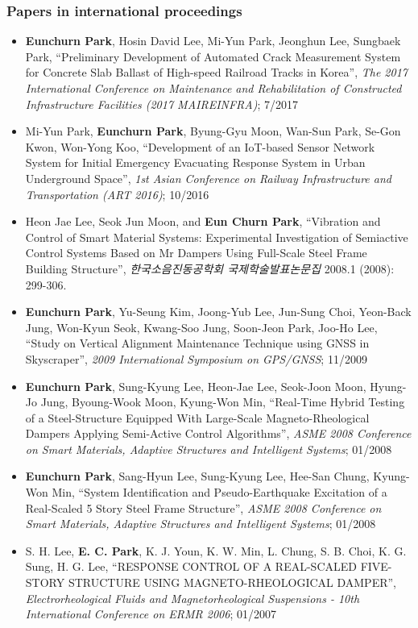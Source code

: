 \subsubsection*{Papers in international proceedings}
\begin{itemize}
\item
  \textbf{Eunchurn Park}, Hosin David Lee, Mi-Yun Park, Jeonghun Lee, Sungbaek Park, ``Preliminary Development of Automated Crack Measurement System for Concrete Slab Ballast of High-speed Railroad Tracks in Korea'', \emph{The 2017 International Conference on Maintenance and Rehabilitation of Constructed Infrastructure Facilities (2017 MAIREINFRA)}; 7/2017
\item
  Mi-Yun Park, \textbf{Eunchurn Park}, Byung-Gyu Moon, Wan-Sun Park, Se-Gon Kwon, Won-Yong Koo, ``Development of an IoT-based Sensor Network System for Initial Emergency Evacuating Response System in Urban Underground Space'', \emph{1st Asian Conference on Railway Infrastructure and Transportation (ART 2016)}; 10/2016
\item
  Heon Jae Lee, Seok Jun Moon, and \textbf{Eun Churn Park}, ``Vibration and Control of Smart Material Systems: Experimental Investigation of Semiactive Control Systems Based on Mr Dampers Using Full-Scale Steel Frame Building Structure'', \emph{한국소음진동공학회 국제학술발표논문집} 2008.1 (2008): 299-306.
\item
  \textbf{Eunchurn Park}, Yu-Seung Kim, Joong-Yub Lee, Jun-Sung Choi,
  Yeon-Back Jung, Won-Kyun Seok, Kwang-Soo Jung, Soon-Jeon Park, Joo-Ho
  Lee, ``Study on Vertical Alignment Maintenance Technique using GNSS in
  Skyscraper'', \emph{2009 International Symposium on GPS/GNSS}; 11/2009
\item
  \textbf{Eunchurn Park}, Sung-Kyung Lee, Heon-Jae Lee, Seok-Joon Moon,
  Hyung-Jo Jung, Byoung-Wook Moon, Kyung-Won Min, ``Real-Time Hybrid
  Testing of a Steel-Structure Equipped With Large-Scale
  Magneto-Rheological Dampers Applying Semi-Active Control Algorithms'',
  \emph{ASME 2008 Conference on Smart Materials, Adaptive Structures and
  Intelligent Systems}; 01/2008
\item
  \textbf{Eunchurn Park}, Sang-Hyun Lee, Sung-Kyung Lee, Hee-San Chung,
  Kyung-Won Min, ``System Identification and Pseudo-Earthquake
  Excitation of a Real-Scaled 5 Story Steel Frame Structure'',
  \emph{ASME 2008 Conference on Smart Materials, Adaptive Structures and
  Intelligent Systems}; 01/2008
\item
  S. H. Lee, \textbf{E. C. Park}, K. J. Youn, K. W. Min, L. Chung, S. B.
  Choi, K. G. Sung, H. G. Lee, ``RESPONSE CONTROL OF A REAL-SCALED
  FIVE-STORY STRUCTURE USING MAGNETO-RHEOLOGICAL DAMPER'',
  \emph{Electrorheological Fluids and Magnetorheological Suspensions -
  10th International Conference on ERMR 2006}; 01/2007
\end{itemize}

